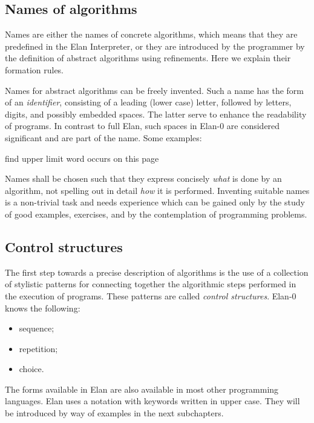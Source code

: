 \subsection{Names of algorithms}

Names are either the names of concrete algorithms, which means
that they are predefined in the Elan Interpreter, or they are
introduced by the programmer by the definition of abstract algorithms
using refinements. Here we explain their formation rules.

Names for abstract algorithms can be freely invented. Such a
name has the form of an {\em identifier}, consisting of a leading
(lower case) letter, followed by letters, digits, and possibly
embedded spaces. The latter serve to enhance the readability
of programs. In contrast to full Elan, such spaces in Elan-0
are considered significant and are part of the name. Some examples:

\begin{elan}
        find upper limit
        word occurs on this page
\end{elan}

\noindent
Names shall be chosen such that they express concisely {\em what}
is done by an algorithm, not
spelling out in detail {\em how} it is performed. Inventing suitable
names is a non-trivial task and needs experience which can be
gained only by the study of good examples, exercises, and by
the contemplation of programming problems.

\subsection{Control structures}

The first step towards a precise description of algorithms is
the use of a collection of stylistic patterns for connecting
together the algorithmic steps performed in the execution of
programs. These patterns are called {\em control structures}.
Elan-0 knows the following:

\begin{itemize}
\item sequence;
\item repetition;
\item choice.
\end{itemize}

\noindent
The forms available in Elan are also available in most other
programming languages. Elan uses a notation with keywords written
in upper case. They will be introduced by way of examples in
the next subchapters.

